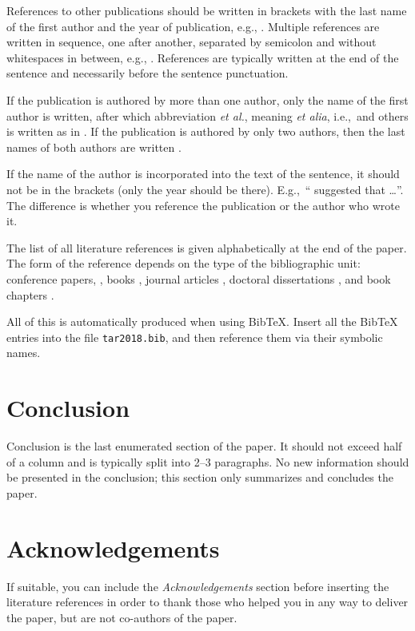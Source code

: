 \documentclass[10pt, a4paper]{article}
\begin{document}
References to other publications should be written in brackets with the last name of the first author and the year of publication, e.g., \citep{chomsky-73}.  Multiple references are written in sequence, one after another, separated by semicolon and without whitespaces in between, e.g., \citep{chomsky-73,chave-64,feigl-58}. References are typically written at the end of the sentence and necessarily before the sentence punctuation.

If the publication is authored by more than one author, only the name of the first author is written, after which abbreviation \emph{et al.}, meaning \emph{et alia}, i.e.,~and others is written as in \citep{johnson-etc}. If the publication is authored by only two authors, then the last names of both authors are written \citep{johnson-howells}.

If the name of the author is incorporated into the text of the sentence, it should not be in the brackets (only the year should be there). E.g.,~``\citet{chomsky-73}
suggested that \dots''. The difference is whether you reference the publication or the author who wrote it. 

The list of all literature references is given alphabetically at the end of the paper. The form of the reference depends on the type of the bibliographic unit: conference papers,
\citep{chave-64}, books \citep{butcher-81}, journal articles
\citep{howells-51}, doctoral dissertations \citep{croft-78}, and book chapters \citep{feigl-58}. 

All of this is automatically produced when using BibTeX. Insert all the BibTeX entries into the file \texttt{tar2018.bib}, and then reference them via their symbolic names.

\section{Conclusion}

Conclusion is the last enumerated section of the paper. It should not exceed half of a column and is typically split into 2--3 paragraphs. No new information should be presented in the conclusion; this section only summarizes and concludes the paper.

\section*{Acknowledgements}

If suitable, you can include the \textit{Acknowledgements} section before inserting the literature references  in order to thank those who helped you in any way to deliver the paper, but are not co-authors of the paper.


 
\end{document}
